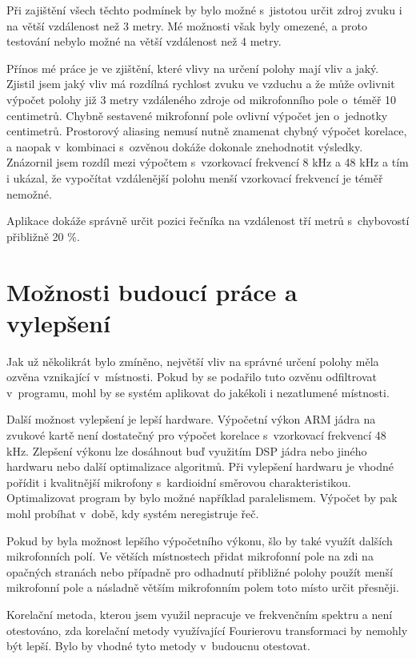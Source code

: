 Při zajištění všech těchto podmínek by bylo možné s~jistotou určit zdroj zvuku i na větší vzdálenost než 3 metry. Mé možnosti však byly omezené, a proto testování nebylo možné na větší vzdálenost než 4 metry.

Přínos mé práce je ve zjištění, které vlivy na určení polohy mají vliv a jaký. Zjistil jsem jaký vliv má rozdílná rychlost zvuku ve vzduchu a že může ovlivnit výpočet polohy již 3 metry vzdáleného zdroje od mikrofonního pole o~téměř 10 centimetrů. Chybně sestavené mikrofonní pole ovlivní výpočet jen o~jednotky centimetrů. Prostorový aliasing nemusí nutně znamenat chybný výpočet korelace, a naopak v~kombinaci s~ozvěnou dokáže dokonale znehodnotit výsledky. Znázornil jsem rozdíl mezi výpočtem s~vzorkovací frekvencí 8 kHz a 48 kHz a tím i ukázal, že vypočítat vzdálenější polohu menší vzorkovací frekvencí je téměř nemožné.

Aplikace dokáže správně určit pozici řečníka na vzdálenost tří metrů s~chybovostí přibližně 20 \%.

\section{Možnosti budoucí práce a vylepšení}

Jak už několikrát bylo zmíněno, největší vliv na správné určení polohy měla ozvěna vznikající v~místnosti. Pokud by se podařilo tuto ozvěnu odfiltrovat v~programu, mohl by se systém aplikovat do jakékoli i nezatlumené místnosti.

Další možnost vylepšení je lepší hardware. Výpočetní výkon ARM jádra na zvukové kartě není dostatečný pro výpočet korelace s~vzorkovací frekvencí 48 kHz. Zlepšení výkonu lze dosáhnout buď využitím DSP jádra nebo jiného hardwaru nebo další optimalizace algoritmů. Při vylepšení hardwaru je vhodné pořídit i kvalitnější mikrofony s~kardioidní směrovou charakteristikou. Optimalizovat program by bylo možné například paralelismem. Výpočet by pak mohl probíhat v~době, kdy systém neregistruje řeč.

Pokud by byla možnost lepšího výpočetního výkonu, šlo by také využít dalších mikrofonních polí. Ve větších místnostech přidat mikrofonní pole na zdi na opačných stranách nebo případně pro odhadnutí přibližné polohy použít menší mikrofonní pole a násladně větším mikrofonním polem toto místo určit přesněji.

Korelační metoda, kterou jsem využil nepracuje ve frekvenčním spektru a není otestováno, zda korelační metody využívající Fourierovu transformaci by nemohly být lepší. Bylo by vhodné tyto metody v~budoucnu otestovat.

